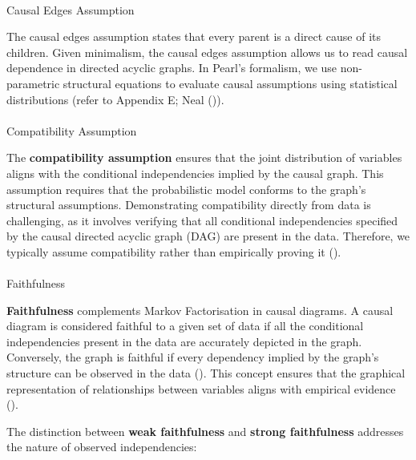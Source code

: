 \documentclass[
  single column]{article}
\makeatletter
\let\oldparagraph\paragraph
\renewcommand{\paragraph}{
    \@ifstar
      \xxxParagraphStar
      \xxxParagraphNoStar
  }
\newcommand{\xxxParagraphStar}[1]{\oldparagraph*{#1}\mbox{}}
\newcommand{\xxxParagraphNoStar}[1]{\oldparagraph{#1}\mbox{}}
\makeatother
\begin{document}
\paragraph{Causal Edges Assumption}\label{causal-edges-assumption}

The causal edges assumption states that every parent is a direct cause
of its children. Given minimalism, the causal edges assumption allows us
to read causal dependence in directed acyclic graphs. In Pearl's
formalism, we use non-parametric structural equations to evaluate causal
assumptions using statistical distributions (refer to Appendix E; Neal
()).

\paragraph{Compatibility Assumption}\label{compatibility-assumption}

The \textbf{compatibility assumption} ensures that the joint
distribution of variables aligns with the conditional independencies
implied by the causal graph. This assumption requires that the
probabilistic model conforms to the graph's structural assumptions.
Demonstrating compatibility directly from data is challenging, as it
involves verifying that all conditional independencies specified by the
causal directed acyclic graph (DAG) are present in the data. Therefore,
we typically assume compatibility rather than empirically proving it
().

\paragraph{Faithfulness}\label{faithfulness}

\textbf{Faithfulness} complements Markov Factorisation in causal
diagrams. A causal diagram is considered faithful to a given set of data
if all the conditional independencies present in the data are accurately
depicted in the graph. Conversely, the graph is faithful if every
dependency implied by the graph's structure can be observed in the data
(). This concept
ensures that the graphical representation of relationships between
variables aligns with empirical evidence
().

The distinction between \textbf{weak faithfulness} and \textbf{strong
faithfulness} addresses the nature of observed independencies:
\end{document}
